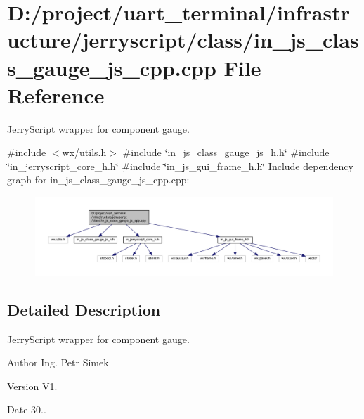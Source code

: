 \section{D\+:/project/uart\+\_\+terminal/infrastructure/jerryscript/class/in\+\_\+js\+\_\+class\+\_\+gauge\+\_\+js\+\_\+cpp.cpp File Reference}
\label{in__js__class__gauge__js__cpp_8cpp}


Jerry\+Script wrapper for component gauge.  


{\ttfamily \#include $<$wx/utils.\+h$>$}\newline
{\ttfamily \#include \char`\"{}in\+\_\+js\+\_\+class\+\_\+gauge\+\_\+js\+\_\+h.\+h\char`\"{}}\newline
{\ttfamily \#include \char`\"{}in\+\_\+jerryscript\+\_\+core\+\_\+h.\+h\char`\"{}}\newline
{\ttfamily \#include \char`\"{}in\+\_\+js\+\_\+gui\+\_\+frame\+\_\+h.\+h\char`\"{}}\newline
Include dependency graph for in\+\_\+js\+\_\+class\+\_\+gauge\+\_\+js\+\_\+cpp.\+cpp\+:\nopagebreak
\begin{figure}[H]
\begin{center}
\leavevmode
\includegraphics[width=350pt]{in__js__class__gauge__js__cpp_8cpp__incl}
\end{center}
\end{figure}


\subsection{Detailed Description}
Jerry\+Script wrapper for component gauge. 

\begin{DoxyAuthor}{Author}
Ing. Petr Simek 
\end{DoxyAuthor}
\begin{DoxyVersion}{Version}
V1. 
\end{DoxyVersion}
\begin{DoxyDate}{Date}
30.. 
\end{DoxyDate}
